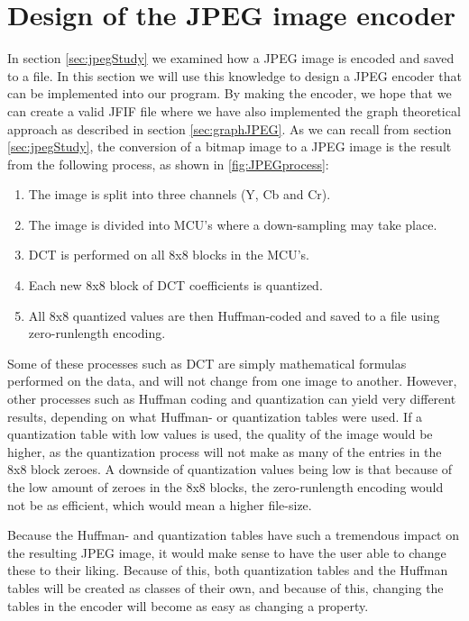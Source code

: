 \section{Design of the JPEG image encoder}
\label{sec:designJPEG}
In section \ref{sec:jpegStudy} we examined how a JPEG image is encoded and saved to a file.
In this section we will use this knowledge to design a JPEG encoder that can be implemented into our program.
By making the encoder, we hope that we can create a valid JFIF file where we have also implemented the graph theoretical approach as described in section \ref{sec:graphJPEG}.
As we can recall from section \ref{sec:jpegStudy}, the conversion of a bitmap image to a JPEG image is the result from the following process, as shown in \ref{fig:JPEGprocess}:

\begin{enumerate}
	\item The image is split into three channels (Y, Cb and Cr).
	\item The image is divided into MCU's where a down-sampling may take place.
	\item DCT is performed on all 8x8 blocks in the MCU's.
	\item Each new 8x8 block of DCT coefficients is quantized.
	\item All 8x8 quantized values are then Huffman-coded and saved to a file using zero-runlength encoding.
\end{enumerate}

Some of these processes such as DCT are simply mathematical formulas performed on the data, and will not change from one image to another.
However, other processes such as Huffman coding and quantization can yield very different results, depending on what Huffman- or quantization tables were used.
If a quantization table with low values is used, the quality of the image would be higher, as the quantization process will not make as many of the entries in the 8x8 block zeroes.
A downside of quantization values being low is that because of the low amount of zeroes in the 8x8 blocks, the zero-runlength encoding would not be as efficient, which would mean a higher file-size.

Because the Huffman- and quantization tables have such a tremendous impact on the resulting JPEG image, it would make sense to have the user able to change these to their liking.
Because of this, both quantization tables and the Huffman tables will be created as classes of their own, and because of this, changing the tables in the encoder will become as easy as changing a property.

